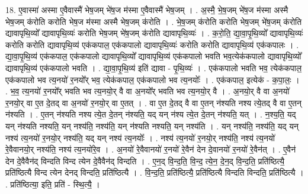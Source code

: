 \documentclass[17pt]{extarticle}
\begin{document}
18. ए॒वास्मा॑ अस्मा ए॒वैवास्मै॑ भेष॒जम् भे॑ष॒ज म॑स्मा ए॒वैवास्मै॑ भेष॒जम् । . अ॒स्मै॒ भे॒ष॒जम् भे॑ष॒ज म॑स्मा अस्मै भेष॒जम् क॑रोति करोति भेष॒ज म॑स्मा अस्मै भेष॒जम् क॑रोति । . भे॒ष॒जम् क॑रोति करोति भेष॒जम् भे॑ष॒जम् क॑रोति द्यावापृथि॒व्यो᳚ द्यावापृथि॒व्यः॑ करोति भेष॒जम् भे॑ष॒जम् क॑रोति द्यावापृथि॒व्यः॑ । . क॒रो॒ति॒ द्या॒वा॒पृ॒थि॒व्यो᳚ द्यावापृथि॒व्यः॑ करोति करोति द्यावापृथि॒व्य॑ एक॑कपाल॒ एक॑कपालो द्यावापृथि॒व्यः॑ करोति करोति द्यावापृथि॒व्य॑ एक॑कपालः । . द्या॒वा॒पृ॒थि॒व्य॑ एक॑कपाल॒ एक॑कपालो द्यावापृथि॒व्यो᳚ द्यावापृथि॒व्य॑ एक॑कपालो भवति भव॒त्येक॑कपालो द्यावापृथि॒व्यो᳚ द्यावापृथि॒व्य॑ एक॑कपालो भवति । . द्या॒वा॒पृ॒थि॒व्य॑ इति॑ द्यावा - पृ॒थि॒व्यः॑ । . एक॑कपालो भवति भव॒ त्येक॑कपाल॒ एक॑कपालो भव त्य॒नयो॑ र॒नयो᳚र् भव॒ त्येक॑कपाल॒ एक॑कपालो भव त्य॒नयोः᳚ । . एक॑कपाल॒ इत्येक॑ - क॒पा॒लः॒ । . भ॒व॒ त्य॒नयो॑ र॒नयो᳚र् भवति भव त्य॒नयो॒र् वै वा अ॒नयो᳚र् भवति भव त्य॒नयो॒र् वै । . अ॒नयो॒र् वै वा अ॒नयो॑ र॒नयो॒र् वा ए॒त दे॒तद् वा अ॒नयो॑ र॒नयो॒र् वा ए॒तत् । . वा ए॒त दे॒तद् वै वा ए॒तन् न॑श्यति नश्य त्ये॒तद् वै वा ए॒तन् न॑श्यति । . ए॒तन् न॑श्यति नश्य त्ये॒त दे॒तन् न॑श्यति॒ यद् यन् न॑श्य त्ये॒त दे॒तन् न॑श्यति॒ यत् । . न॒श्य॒ति॒ यद् यन् न॑श्यति नश्यति॒ यन् नश्य॑ति॒ नश्य॑ति॒ यन् न॑श्यति नश्यति॒ यन् नश्य॑ति । . यन् नश्य॑ति॒ नश्य॑ति॒ यद् यन् नश्य॑ त्य॒नयो॑ र॒नयो॒र् नश्य॑ति॒ यद् यन् नश्य॑ त्य॒नयोः᳚ । . नश्य॑ त्य॒नयो॑ र॒नयो॒र् नश्य॑ति॒ नश्य॑ त्य॒नयो॑ रे॒वैवानयो॒र् नश्य॑ति॒ नश्य॑ त्य॒नयो॑रे॒व । . अ॒नयो॑ रे॒वैवानयो॑ र॒नयो॑ रे॒वैन॑ देन दे॒वानयो॑ र॒नयो॑ रे॒वैन॑त् । . ए॒वैन॑ देन दे॒वैवैन॑द् विन्दति विन्द त्येन दे॒वैवैन॑द् विन्दति । . ए॒न॒द् वि॒न्द॒ति॒ वि॒न्द॒ त्ये॒न॒ दे॒न॒द् वि॒न्द॒ति॒ प्रति॑ष्ठित्यै॒ प्रति॑ष्ठित्यै विन्द त्येन देनद् विन्दति॒ प्रति॑ष्ठित्यै । . वि॒न्द॒ति॒ प्रति॑ष्ठित्यै॒ प्रति॑ष्ठित्यै विन्दति विन्दति॒ प्रति॑ष्ठित्यै । . प्रति॑ष्ठित्या॒ इति॒ प्रति॑ - स्थि॒त्यै॒ । \newline
\pagebreak
{}
\end{document}
